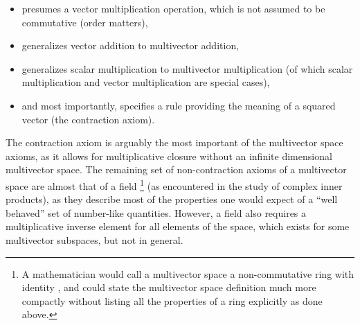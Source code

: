 \begin{itemize}
\item presumes a vector multiplication operation, which is not assumed to be commutative (order matters),
\item generalizes vector addition to multivector addition,
\item generalizes scalar multiplication to multivector multiplication (of which scalar multiplication and vector multiplication are special cases),
\item and most importantly, specifies a rule providing the meaning of a squared vector (the contraction axiom).
\end{itemize}

The contraction axiom is arguably the most important of the multivector space axioms, as it allows for multiplicative closure without an infinite dimensional multivector space.
The remaining set of non-contraction axioms of a multivector space are almost that of a field
\footnote{A mathematician would call a multivector space a non-commutative ring with identity \citep{van1943modern}, and could state the multivector space definition much more compactly without listing all the properties of a ring explicitly as done above.}
(as encountered in the study of complex inner products),
as they describe most of the properties one
would expect of a ``well behaved'' set of number-like quantities.
However, a field also requires a multiplicative inverse element for all elements of the space, which exists for some multivector subspaces, but not in general.


